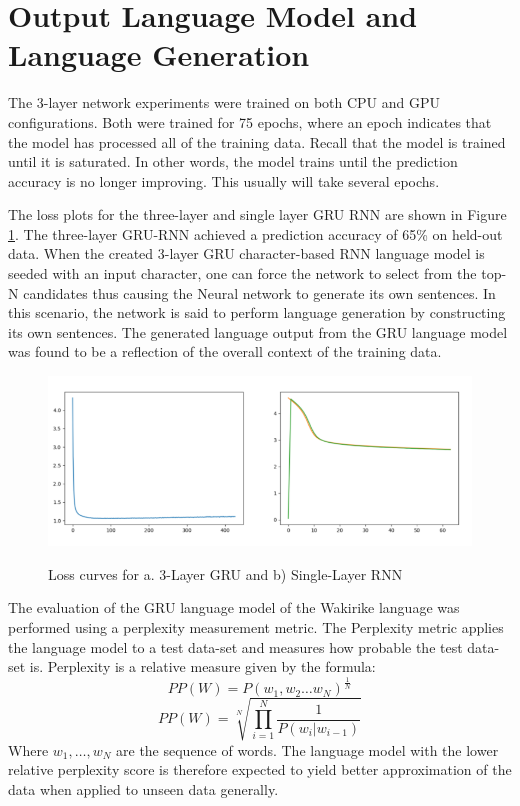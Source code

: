 \stopblue


\section{Output Language Model and Language Generation}\label{sec6_4}
\startblue
The 3-layer network experiments were trained on both CPU and GPU configurations. Both were trained for 75 epochs, where an epoch indicates that the model has processed all of the training data.  Recall that the model  is trained until it is saturated.  In other words, the model trains until the prediction accuracy is no longer improving.   This usually will take several epochs.

The loss plots for the three-layer and single layer GRU RNN are shown in Figure \ref{fig_ch7_00losses}.  The three-layer GRU-RNN achieved a prediction accuracy of 65\% on held-out data.  When the created 3-layer GRU character-based RNN language model is seeded with an input character, one can force the network to select from the top-N candidates thus causing the Neural network to generate its own sentences.  In this scenario, the network is said to perform language generation by constructing its own sentences.  The generated language output from the GRU language model was found to be a reflection of the overall context of the training data. 

\begin{figure}
\centering
  \includegraphics[width=14cm]{thesis/images/losses_slgru}\\
  \caption{Loss curves for a. 3-Layer GRU and b) Single-Layer RNN} \label{fig_ch7_00losses}
\end{figure}

The evaluation of the GRU language model of the Wakirike language was performed using a perplexity measurement metric. The Perplexity metric applies the language model to a test data-set and measures how probable the test data-set is. Perplexity is a relative measure given by the formula:
%
\begin{equation}
PP(W)=P(w_1,w_2\dots w_N)^\frac{1}{N}
\label{ch5_eq1_ppx}
\end{equation}
%
%
\begin{equation}
PP(W)=\sqrt[N]{\prod_{i=1}^N\frac{1}{P(w_i|w_{i-1})}}
\label{ch5_eq2_ppx}
\end{equation}
%
Where $w_1,\dots,w_N$ are the sequence of words. The language model with the lower relative perplexity score is therefore expected to yield better approximation of the data when applied to unseen data generally.

